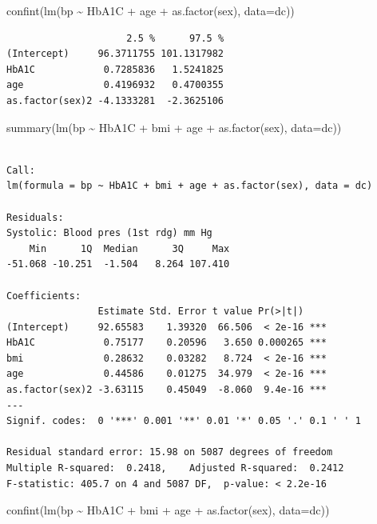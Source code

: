 \documentclass[
  letterpaper,
  DIV=11,
  numbers=noendperiod]{scrartcl}
\newenvironment{Shaded}{\begin{snugshade}}{\end{snugshade}}
\newcommand{\AttributeTok}[1]{\textcolor[rgb]{0.40,0.45,0.13}{#1}}
\newcommand{\FunctionTok}[1]{\textcolor[rgb]{0.28,0.35,0.67}{#1}}
\newcommand{\NormalTok}[1]{\textcolor[rgb]{0.00,0.23,0.31}{#1}}
\newcommand{\SpecialCharTok}[1]{\textcolor[rgb]{0.37,0.37,0.37}{#1}}
\begin{document}
\begin{Shaded}
\begin{Highlighting}[]
\FunctionTok{confint}\NormalTok{(}\FunctionTok{lm}\NormalTok{(bp }\SpecialCharTok{\textasciitilde{}}\NormalTok{ HbA1C }\SpecialCharTok{+}\NormalTok{ age }\SpecialCharTok{+} \FunctionTok{as.factor}\NormalTok{(sex), }\AttributeTok{data=}\NormalTok{dc))}
\end{Highlighting}
\end{Shaded}

\begin{verbatim}
                     2.5 %      97.5 %
(Intercept)     96.3711755 101.1317982
HbA1C            0.7285836   1.5241825
age              0.4196932   0.4700355
as.factor(sex)2 -4.1333281  -2.3625106
\end{verbatim}

\begin{Shaded}
\begin{Highlighting}[]
\FunctionTok{summary}\NormalTok{(}\FunctionTok{lm}\NormalTok{(bp }\SpecialCharTok{\textasciitilde{}}\NormalTok{ HbA1C }\SpecialCharTok{+}\NormalTok{ bmi }\SpecialCharTok{+}\NormalTok{ age }\SpecialCharTok{+} \FunctionTok{as.factor}\NormalTok{(sex), }\AttributeTok{data=}\NormalTok{dc))}
\end{Highlighting}
\end{Shaded}

\begin{verbatim}

Call:
lm(formula = bp ~ HbA1C + bmi + age + as.factor(sex), data = dc)

Residuals:
Systolic: Blood pres (1st rdg) mm Hg 
    Min      1Q  Median      3Q     Max 
-51.068 -10.251  -1.504   8.264 107.410 

Coefficients:
                Estimate Std. Error t value Pr(>|t|)    
(Intercept)     92.65583    1.39320  66.506  < 2e-16 ***
HbA1C            0.75177    0.20596   3.650 0.000265 ***
bmi              0.28632    0.03282   8.724  < 2e-16 ***
age              0.44586    0.01275  34.979  < 2e-16 ***
as.factor(sex)2 -3.63115    0.45049  -8.060  9.4e-16 ***
---
Signif. codes:  0 '***' 0.001 '**' 0.01 '*' 0.05 '.' 0.1 ' ' 1

Residual standard error: 15.98 on 5087 degrees of freedom
Multiple R-squared:  0.2418,    Adjusted R-squared:  0.2412 
F-statistic: 405.7 on 4 and 5087 DF,  p-value: < 2.2e-16
\end{verbatim}

\begin{Shaded}
\begin{Highlighting}[]
\FunctionTok{confint}\NormalTok{(}\FunctionTok{lm}\NormalTok{(bp }\SpecialCharTok{\textasciitilde{}}\NormalTok{ HbA1C }\SpecialCharTok{+}\NormalTok{ bmi }\SpecialCharTok{+}\NormalTok{ age }\SpecialCharTok{+} \FunctionTok{as.factor}\NormalTok{(sex), }\AttributeTok{data=}\NormalTok{dc))}
\end{Highlighting}
\end{Shaded}
\end{document}
